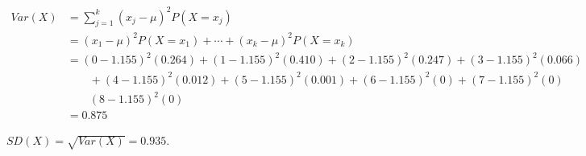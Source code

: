 \documentclass[11pt]{article}
\begin{document}
\begin{align*}
Var(X)  &= \sum_{j=1}^{k} (x_j - \mu)^2 P(X=x_j) \\
  &= (x_1-\mu)^2 P(X=x_1) + \cdots+ (x_k-\mu)^2 P(X=x_k) \\
    &= (0 - 1.155)^{2}(0.264) + (1 - 1.155)^{2}(0.410) + (2 - 1.155)^{2}(0.247) + (3 - 1.155)^{2}(0.066) \\
      & \qquad + (4 - 1.155)^{2}(0.012) + (5 - 1.155)^{2}(0.001) + (6 - 1.155)^{2}(0) + (7 - 1.155)^{2}(0) \\
      & \qquad (8 - 1.155)^{2}(0) \\
    &= 0.875
\end{align*}

\(SD(X) = \sqrt{Var(X)} = 0.935\).


    
    
    
    
\end{document}
